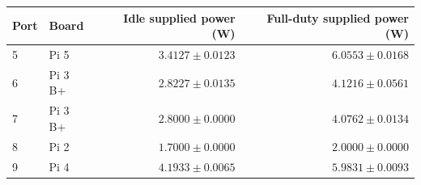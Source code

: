 \begin{tabular}{llrr}
\toprule
Port & Board & Idle supplied power (W) & Full-duty supplied power (W)\\
\midrule
5 & Pi 5 & $3.4127\pm0.0123$ & $6.0553\pm0.0168$\\
6 & Pi 3 B+ & $2.8227\pm0.0135$ & $4.1216\pm0.0561$\\
7 & Pi 3 B+ & $2.8000\pm0.0000$ & $4.0762\pm0.0134$\\
8 & Pi 2 & $1.7000\pm0.0000$ & $2.0000\pm0.0000$\\
9 & Pi 4 & $4.1933\pm0.0065$ & $5.9831\pm0.0093$\\
\bottomrule
\end{tabular}
